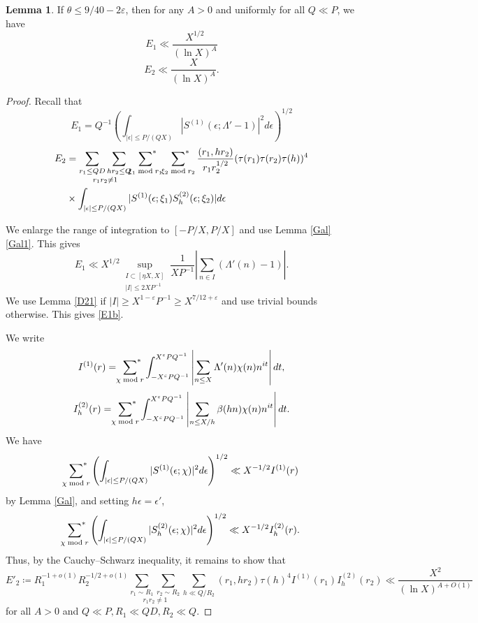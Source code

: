 \documentclass{amsart}
\theoremstyle{definition}
\newtheorem{lem}[dfn]{Lemma}
\theoremstyle{remark}
\newcommand{\1}{
    \bm{1}
}
\begin{document}
\begin{lem}\label{E12}
If $\theta \leq 9/40-2\varepsilon$, then for any $A>0$ and uniformly for all $Q \ll P$, we have
\begin{equation} \label{E1b} E_1 \ll \frac{X^{1/2}}{(\ln{X})^A} \end{equation}
\begin{equation} \label{E2b} E_2 \ll \frac{X}{(\ln{X})^A}. \end{equation}
\end{lem}

\begin{proof}
Recall that
\[ E_1 = Q^{-1} \left( \int_{|\epsilon| \leq P/(QX)} |S^{(1)}(\epsilon;\Lambda'-1)|^2 d\epsilon \right)^{1/2} \]
\begin{align*}
E_2 &= \underset{r_1r_2 \neq 1}{\sum_{r_1 \leq QD} \sum_{h r_2 \leq Q}} \sideset{}{^*}\sum_{\xi_1 \bmod r_1} \sideset{}{^*}\sum_{\xi_2 \bmod r_2} \frac{(r_1,h r_2)}{r_1 r^{1/2}_2} (\tau(r_1) \tau(r_2) \tau(h))^{4} \\
& \times \int_{|\epsilon| \leq P/(QX)} |S^{(1)}(\epsilon;\xi_1) S^{(2)}_{h}(\epsilon;\xi_2)| d\epsilon
\end{align*}

We enlarge the range of integration to $[-P/X,P/X]$ and use Lemma \ref{Gal} \eqref{Gal1}. This gives
\[ E_1 \ll X^{1/2} \sup_{\substack{I \subset [\eta X,X] \\ |I| \leq 2XP^{-1}}} \frac{1}{XP^{-1}} \left| \sum_{n \in I} (\Lambda'(n)-1) \right|. \]
We use Lemma \ref{D21} if $|I| \geq X^{1-\varepsilon} P^{-1} \geq X^{7/12+\varepsilon}$ and use trivial bounds otherwise. This gives \eqref{E1b}. 



We write
\[ I^{(1)}(r) = \sideset{}{^*}\sum_{\chi \bmod r} \int_{-X^{\varepsilon} PQ^{-1}}^{X^{\varepsilon} PQ^{-1}} \left| \sum_{n \leq X} \Lambda'(n) \chi(n) n^{it} \right| dt, \]
\[ I^{(2)}_h(r) = \sideset{}{^*}\sum_{\chi \bmod r} \int_{-X^{\varepsilon} PQ^{-1}}^{X^{\varepsilon} PQ^{-1}} \left| \sum_{n \leq X/h} \beta(hn) \chi(n) n^{it} \right| dt. \]
We have 
\[ \sideset{}{^*}\sum_{\chi \bmod r} \left( \int_{|\epsilon| \leq P/(QX)} |S^{(1)}(\epsilon;\chi)|^2 d\epsilon \right)^{1/2} \ll X^{-1/2} I^{(1)}(r) \]
by Lemma \ref{Gal}, and setting $h\epsilon=\epsilon'$, 
\[ \sideset{}{^*}\sum_{\chi \bmod r} \left( \int_{|\epsilon| \leq P/(QX)} |S^{(2)}_h(\epsilon;\chi)|^2 d\epsilon \right)^{1/2} \ll X^{-1/2} I^{(2)}_h(r). \]
Thus, by the Cauchy--Schwarz inequality, it remains to show that
\begin{equation} \label{R12} E'_2 \coloneqq R^{-1+o(1)}_1 R^{-1/2+o(1)}_2 \underset{r_1r_2 \neq 1}{\sum_{r_1 \sim R_1} \sum_{r_2 \sim R_2}} \sum_{h \ll Q/R_2} (r_1,hr_2) \tau(h)^4 I^{(1)}(r_1) I^{(2)}_h(r_2) \ll \frac{X^2}{(\ln{X})^{A+O(1)}} \end{equation}
for all $A>0$ and $Q \ll P, R_1 \ll QD, R_2 \ll Q$. 




\end{proof}
\end{document}
